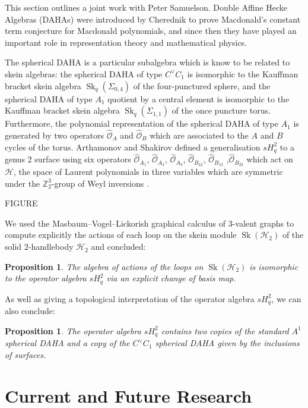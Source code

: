 \documentclass{article}
\newcommand{\Sk}{\operatorname{Sk}}
\newtheorem{prop}[thm]{Proposition}
\begin{document}
This section outlines a joint work with Peter Samuelson. Double Affine Hecke Algebras (DAHAs) were introduced by Cherednik to prove Macdonald's constant term conjecture for Macdonald polynomials, and since then they have played an important role in representation theory and mathematical physics. 

The spherical DAHA is a particular subalgebra which is know to be related to skein algebras: the spherical DAHA of type $C^{\vee}C_1$ is isomorphic to the Kauffman bracket skein algebra $\Sk_q(\Sigma_{0,4})$ of the four-punctured sphere, and the spherical DAHA of type $A_1$ quotient by a central element is isomorphic to the Kauffman bracket skein algebra $\Sk_q(\Sigma_{1,1})$ of the once puncture torus. Furthermore, the polynomial representation of the spherical DAHA of type $A_1$ is generated by two operators $\hat{\mathscr{O}}_A$ and $\hat{\mathscr{O}}_B$ which are associated to the $A$ and $B$ cycles of the torus. Arthamonov and Shakirov defined a generalisation $sH^{2}_q$ to a genus $2$ surface using six operators $\hat{\mathscr{O}}_{A_1}$, $\hat{\mathscr{O}}_{A_2}$, $\hat{\mathscr{O}}_{A_3}$, $\hat{\mathscr{O}}_{B_{12}}$, $\hat{\mathscr{O}}_{B_{13}}$ ,$\hat{\mathscr{O}}_{B_{23}}$ which act on $\mathscr{H}$, the space of Laurent polynomials in three variables which are symmetric under the $\mathbb{Z}^3_2$-group of Weyl inversions \cite{ArthamonovShakirov19}. 

FIGURE

We used the Masbaum--Vogel--Lickorish graphical calculus of $3$-valent graphs \cite{MasbaumVogel94, Lickorish93} to compute explicitly the actions of each loop on the skein module $\Sk(\mathcal{H}_2)$ of the solid $2$-handlebody $\mathcal{H}_2$ and concluded: 

\begin{prop}
The algebra of actions of the loops on $\Sk(\mathcal{H}_2)$ is isomorphic to the operator algebra $sH^2_q$ via an explicit change of basis map. 
\end{prop}

As well as giving a topological interpretation of the operator algebra $sH^2_q$, we can also conclude:

\begin{prop}
The operator algebra $sH^2_q$ contains two copies of the standard $A^1$ spherical DAHA and a copy of the $C^{\vee}C_1$ spherical DAHA given by the inclusions of surfaces. 
\end{prop}

\section{Current and Future Research}
\end{document}

